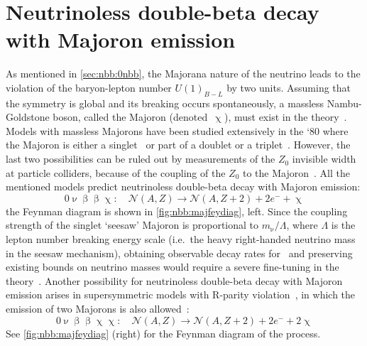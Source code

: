 \begin{table}
  \centering
  \caption{%
    Compilation of current most stringent 90\% C.L.~experimental bounds on
    \thalfzero\ and \mbb\ from \gesix, $^{130}$Te and $^{136}$Xe experiments. A
    value of $g_A \simeq 1.27$ is used.
  }\label{tab:nbb:0nbb-lim}
  
\end{table}

\section{Neutrinoless double-beta decay with Majoron emission}%
\label{sec:nbb:0nbbx}

As mentioned in \cref{sec:nbb:0nbb}, the Majorana nature of the neutrino leads
to the violation of the baryon-lepton number $U{(1)}_{B-L}$ by two units.
Assuming that the symmetry is global and its breaking occurs spontaneously, a
massless Nambu-Goldstone boson, called the Majoron (denoted~$\upchi$), must exist
in the theory~\cite{Chikashige1981, Schechter1982b, Gelmini1981, Georgi1981,
Mohpatra2004}.  Models with massless Majorons have been studied extensively in
the `80 where the Majoron is either a singlet~\cite{Chikashige1981} or part of
a doublet or a triplet~\cite{Gelmini1981, Georgi1981}. However, the last two
possibilities can be ruled out by measurements of the $Z_0$ invisible width at
particle colliders, because of the coupling of the $Z_0$ to the
Majoron~\cite{Berezhiani1992}. All the mentioned models predict neutrinoless
double-beta decay with Majoron emission:
\[
  0\upnu\upbeta\upbeta\upchi:\quad
    \mathcal{N}(A,Z) \longrightarrow \mathcal{N}(A,Z+2) + 2e^- + \upchi
\]
the Feynman diagram is shown in \cref{fig:nbb:majfeydiag}, left. Since the
coupling strength of the singlet `seesaw' Majoron is proportional to $m_{\upnu} /
\Lambda$, where $\Lambda$ is the lepton number breaking energy scale (i.e.~the
heavy right-handed neutrino mass in the seesaw mechanism), obtaining observable
decay rates for \onbbx\ and preserving existing bounds on neutrino masses would
require a severe fine-tuning in the theory~\cite{Burgess1993, Burgess1994}.
\newpar
Another possibility for neutrinoless double-beta decay with Majoron emission
arises in supersymmetric models with R-parity violation~\cite{Masiero1990,
Mohpatra2004}, in which the emission of two Majorons is also
allowed~\cite{Mohpatra1988}:
\[
  0\upnu\upbeta\upbeta\upchi\upchi:\quad
    \mathcal{N}(A,Z) \longrightarrow \mathcal{N}(A,Z+2) + 2e^- + 2\upchi
\]
See \cref{fig:nbb:majfeydiag} (right) for the Feynman diagram of the process.
